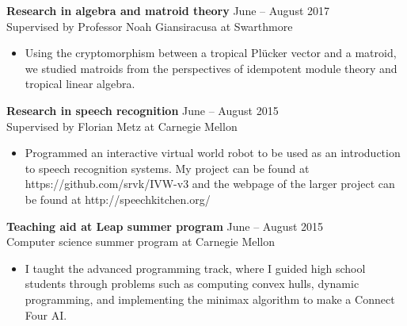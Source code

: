 \documentclass[10pt]{res} %
\begin{document}
\begin{resume}
\vspace{8pt} %

{\bf Research in algebra and matroid theory} \hfill June -- August 2017 \\
Supervised by Professor Noah Giansiracusa at Swarthmore
\begin{itemize} \itemsep -2pt %
        \item Using the cryptomorphism between a tropical Pl\"{u}cker 
            vector and a 
    matroid, we studied matroids from the perspectives of 
        idempotent module theory and tropical linear algebra.
\end{itemize}

{\bf Research in speech recognition} \hfill June -- August 2015 \\[2pt]
Supervised by Florian Metz at Carnegie Mellon
\begin{itemize} \itemsep -2pt %
    \item Programmed an interactive virtual world robot to be used as an 
        introduction to speech recognition systems. My project can be 
        found at https://github.com/srvk/IVW-v3 and the webpage of the 
        larger project can be found at http://speechkitchen.org/
\end{itemize}

{\bf Teaching aid at Leap summer program} \hfill June -- August 2015
    \\[2pt]
    Computer science summer program at Carnegie Mellon
\begin{itemize} \itemsep -2pt %
        \item I taught the advanced programming track, where I guided 
            high school students through problems such as computing convex 
            hulls, dynamic programming, and implementing the minimax 
            algorithm to make a Connect Four AI.
\end{itemize}

\vspace{0.2in} %



\end{resume}
\end{document}

